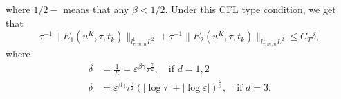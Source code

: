 \documentclass[10pt,a4paper]{article}
\begin{document}
  where \(1/2-\) means that any \(\beta < 1/2.\) 
  Under this CFL type condition, we get that 
  \begin{equation}\label{F1F2linftyL2}
    \tau^{-1}\|E_1(u^K,\tau,t_k)\|_{l^1_{\tau,m,n} L^2} + 
    \tau^{-1}\|E_2(u^K,\tau,t_k)\|_{l^1_{\tau,m,n} L^2} \leq C_T \delta,
  \end{equation}
  where
  \begin{equation}\label{delta}
    \begin{aligned}
      \delta &= \frac1K = \varepsilon^{\beta\gamma} \tau^{\frac\gamma2}, \quad \text{if } d=1,2\\ 
      \delta &= \varepsilon^{\beta\gamma} \tau^{\frac\gamma2}(|\log\tau|+|\log\varepsilon|)^\frac23,
      \quad \text{if } d=3 .
    \end{aligned}
  \end{equation}
\end{document}
